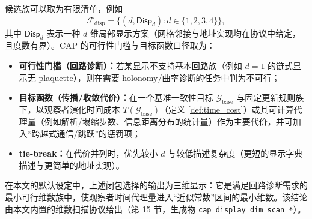 候选族可以取为有限清单，例如
$$
\mathcal F_{\mathrm{disp}}=\{(d,\mathsf{Disp}_d): d\in\{1,2,3,4\}\},
$$
其中 $\mathsf{Disp}_d$ 表示一种 $d$ 维局部显示方案（网格邻接与地址实现均在协议中给定，且度数有界）。CAP 的可行性门槛与目标函数口径取为：
\begin{itemize}
  \item \textbf{可行性门槛（回路诊断）：}若某显示不支持基本回路族（例如 $d=1$ 的链式显示无 plaquette），则在需要 holonomy/曲率诊断的任务中判为不可行；
  \item \textbf{目标函数（传播/收敛代价）：}在一个基准一致性目标 $\mathcal G_{\mathrm{base}}$ 与固定更新规则族下，以观察者演化时间成本 $T(\mathcal G_{\mathrm{base}})$（定义 \ref{def:time_cost}）或其可计算代理量（例如解析/塌缩步数、信息距离分布的统计量）作为主要代价，并可加入“跨越式通信/跳跃”的惩罚项；
  \item \textbf{tie-break：}在代价并列时，优先较小 $d$ 与较低描述复杂度（更短的显示字典描述与更简单的地址实现）。
\end{itemize}
\AuditTag 在本文的默认设定中，上述闭包选择的输出为三维显示：它是满足回路诊断需求的最小可行维数族中，使观察者时间代理量进入“近似常数”区间的最小维数。该结论由本文内置的维数扫描协议给出（第 15 节，生成物 \texttt{cap\_display\_dim\_scan\_*}）。\par

